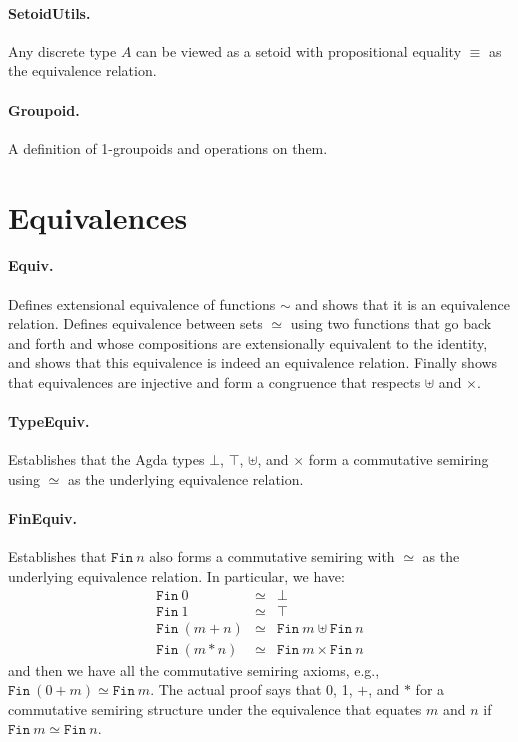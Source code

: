 \documentclass{article}
\begin{document}
\paragraph*{SetoidUtils.} Any discrete type $A$ can be viewed as a
setoid with propositional equality $\equiv$ as the equivalence
relation.

\paragraph*{Groupoid.} A definition of 1-groupoids and operations on
them.

\section{Equivalences} 

\paragraph*{Equiv.} Defines extensional equivalence of functions
$\sim$ and shows that it is an equivalence relation. Defines
equivalence between sets $\simeq$ using two functions that go back and
forth and whose compositions are extensionally equivalent to the
identity, and shows that this equivalence is indeed an equivalence
relation. Finally shows that equivalences are injective and form a
congruence that respects $\uplus$ and $\times$. 

\paragraph*{TypeEquiv.} Establishes that the Agda types $\bot$,
$\top$, $\uplus$, and $\times$ form a commutative semiring using
$\simeq$ as the underlying equivalence relation.

\paragraph*{FinEquiv.} Establishes that $\texttt{Fin}~n$ also forms a
commutative semiring with $\simeq$ as the underlying equivalence
relation. In particular, we have:
\[\begin{array}{rcll}
\texttt{Fin}~0 &\simeq& \bot \\
\texttt{Fin}~1 &\simeq& \top \\
\texttt{Fin}~(m+n) &\simeq& \texttt{Fin}~m \uplus \texttt{Fin}~n \\
\texttt{Fin}~(m*n) &\simeq& \texttt{Fin}~m \times \texttt{Fin}~n
\end{array}\]
and then we have all the commutative semiring axioms, e.g.,
$\texttt{Fin}~(0+m) \simeq \texttt{Fin}~m$. The actual proof says that
0, 1, $+$, and $*$ for a commutative semiring structure under the
equivalence that equates $m$ and $n$ if
$\texttt{Fin}~m \simeq \texttt{Fin}~n$.
\end{document}
